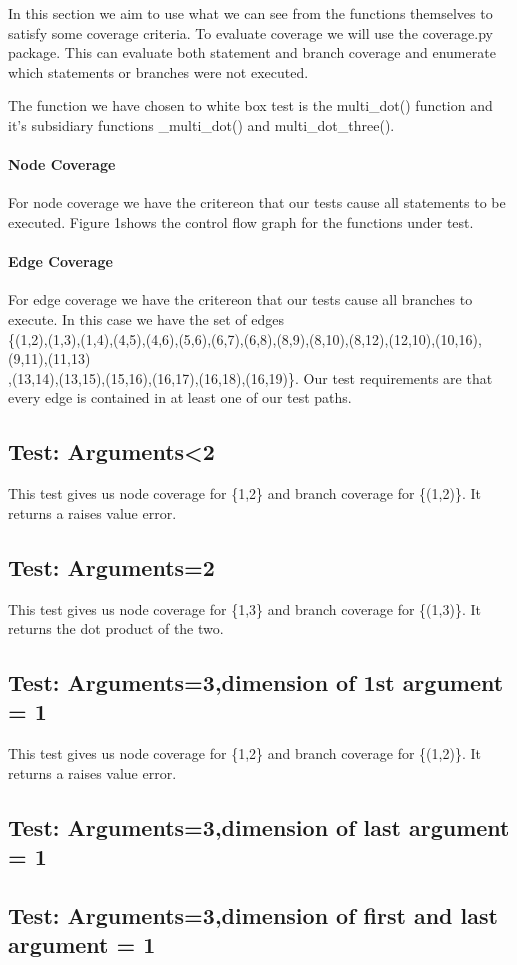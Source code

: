 In this section we aim to use what we can see from the functions themselves to satisfy some coverage
criteria. To evaluate coverage we will use the coverage.py package. This can evaluate both statement and branch coverage and enumerate which statements or branches were not executed.

The function we have chosen to white box test is the multi\_dot() function and it's subsidiary functions \_multi\_dot() and multi\_dot\_three().

\paragraph{Node Coverage}


For node coverage we have the critereon that our tests cause all statements to be executed. Figure 1shows the control flow graph for the functions under test. 



\paragraph{Edge Coverage}

For edge coverage we have the critereon that our tests cause all branches to execute. In this case we have the set of edges \\
\{(1,2),(1,3),(1,4),(4,5),(4,6),(5,6),(6,7),(6,8),(8,9),(8,10),(8,12),(12,10),(10,16),(9,11),(11,13)\\
,(13,14),(13,15),(15,16),(16,17),(16,18),(16,19)\}.
Our test requirements are that every edge is contained in at least one of our test paths.

\subsection{Test: Arguments<2}
This test gives us node coverage for \{1,2\} and branch coverage for \{(1,2)\}. It returns a raises value error.

\subsection{Test: Arguments=2}

This test gives us node coverage for \{1,3\} and branch coverage for \{(1,3)\}. It returns the dot product of the two.


\subsection{Test: Arguments=3,dimension of 1st argument = 1}

This test gives us node coverage for \{1,2\} and branch coverage for \{(1,2)\}. It returns a raises value error.



\subsection{Test: Arguments=3,dimension of last argument = 1}


\subsection{Test: Arguments=3,dimension of first and last argument = 1}
